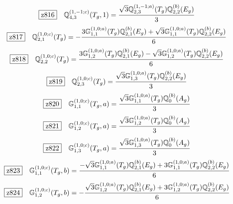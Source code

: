 \documentclass[fleqn,10pt,landscape]{jsarticle}
\begin{document}
\begin{dmath*}
\hspace*{3mm}\fbox{z816}\quad \mathbb{Q}_{4,3}^{(1,-1;c)}(T_{g},1)=\frac{\sqrt{3} \mathbb{Q}_{2,3}^{(1,-1;a)}(T_{g}) \mathbb{Q}_{2,2}^{(b)}(E_{g})}{3}
\end{dmath*}
\begin{dmath*}
\hspace*{3mm}\fbox{z817}\quad \mathbb{Q}_{2,1}^{(1,0;c)}(T_{g})=- \frac{3 \mathbb{G}_{1,1}^{(1,0;a)}(T_{g}) \mathbb{Q}_{2,1}^{(b)}(E_{g}) + \sqrt{3} \mathbb{G}_{1,1}^{(1,0;a)}(T_{g}) \mathbb{Q}_{2,2}^{(b)}(E_{g})}{6}
\end{dmath*}
\begin{dmath*}
\hspace*{3mm}\fbox{z818}\quad \mathbb{Q}_{2,2}^{(1,0;c)}(T_{g})=\frac{3 \mathbb{G}_{1,2}^{(1,0;a)}(T_{g}) \mathbb{Q}_{2,1}^{(b)}(E_{g}) - \sqrt{3} \mathbb{G}_{1,2}^{(1,0;a)}(T_{g}) \mathbb{Q}_{2,2}^{(b)}(E_{g})}{6}
\end{dmath*}
\begin{dmath*}
\hspace*{3mm}\fbox{z819}\quad \mathbb{Q}_{2,3}^{(1,0;c)}(T_{g})=\frac{\sqrt{3} \mathbb{G}_{1,3}^{(1,0;a)}(T_{g}) \mathbb{Q}_{2,2}^{(b)}(E_{g})}{3}
\end{dmath*}
\begin{dmath*}
\hspace*{3mm}\fbox{z820}\quad \mathbb{G}_{1,1}^{(1,0;c)}(T_{g},a)=\frac{\sqrt{3} \mathbb{G}_{1,1}^{(1,0;a)}(T_{g}) \mathbb{Q}_{0}^{(b)}(A_{g})}{3}
\end{dmath*}
\begin{dmath*}
\hspace*{3mm}\fbox{z821}\quad \mathbb{G}_{1,2}^{(1,0;c)}(T_{g},a)=\frac{\sqrt{3} \mathbb{G}_{1,2}^{(1,0;a)}(T_{g}) \mathbb{Q}_{0}^{(b)}(A_{g})}{3}
\end{dmath*}
\begin{dmath*}
\hspace*{3mm}\fbox{z822}\quad \mathbb{G}_{1,3}^{(1,0;c)}(T_{g},a)=\frac{\sqrt{3} \mathbb{G}_{1,3}^{(1,0;a)}(T_{g}) \mathbb{Q}_{0}^{(b)}(A_{g})}{3}
\end{dmath*}
\begin{dmath*}
\hspace*{3mm}\fbox{z823}\quad \mathbb{G}_{1,1}^{(1,0;c)}(T_{g},b)=\frac{- \sqrt{3} \mathbb{G}_{1,1}^{(1,0;a)}(T_{g}) \mathbb{Q}_{2,1}^{(b)}(E_{g}) + 3 \mathbb{G}_{1,1}^{(1,0;a)}(T_{g}) \mathbb{Q}_{2,2}^{(b)}(E_{g})}{6}
\end{dmath*}
\begin{dmath*}
\hspace*{3mm}\fbox{z824}\quad \mathbb{G}_{1,2}^{(1,0;c)}(T_{g},b)=- \frac{\sqrt{3} \mathbb{G}_{1,2}^{(1,0;a)}(T_{g}) \mathbb{Q}_{2,1}^{(b)}(E_{g}) + 3 \mathbb{G}_{1,2}^{(1,0;a)}(T_{g}) \mathbb{Q}_{2,2}^{(b)}(E_{g})}{6}
\end{dmath*}
\end{document}

